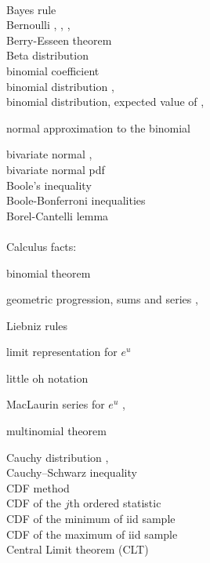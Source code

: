 \documentclass[12pt]{article}
\begin{document}
\\
\noindent Bayes rule \pageref{bayesrule1}\\
\noindent Bernoulli \pageref{e:bernoulli}, \pageref{d:bernoullip}, \pageref{e:bernoullipmean}, \pageref{bernoullipmoments}\\
\noindent Berry-Esseen theorem \pageref{berryesseen}\\
\noindent Beta distribution \pageref{betadistributionexample}\\
\noindent binomial coefficient \pageref{d:binomialcoeff}\\
\noindent binomial distribution \pageref{binomdist1}, \pageref{d:binomialnp}\\
\noindent binomial distribution, expected value of \pageref{e:binomialnpmean}, \pageref{expectedvalueofbinomial}

\quad normal approximation to the binomial \pageref{normalapproxtobinomial}

\noindent bivariate normal \pageref{bivariatenormaldist}, \pageref{bivariatenormal=2variate}\\
\noindent bivariate normal pdf \pageref{bivariatenormalpdf}\\
\noindent Boole's inequality \pageref{subadd1}\\
\noindent Boole-Bonferroni inequalities \pageref{boolebonferroni}\\
\noindent Borel-Cantelli lemma \pageref{borelcantelli}\\


\\
Calculus facts:

binomial theorem \pageref{d:binomialtheorem}

geometric progression, sums and series \pageref{d:geomseries1}, \pageref{d:geomseries}

Liebniz rules \pageref{liebnizrule}

limit representation for $e^u$ \pageref{d:limitrep}

little oh notation \pageref{d:littleoh}

MacLaurin series for $e^u$ \pageref{d:maclaurinseries1}, \pageref{d:maclaurinseries}

multinomial theorem \pageref{multinomialtheorem}

\noindent Cauchy distribution \pageref{Cauchypdf}, \pageref{Cauchypdf2}\\
\noindent Cauchy--Schwarz inequality \pageref{cauchyschwarz2}\\
\noindent CDF method \pageref{cdfmethod1}\\
\noindent CDF of the $j$th ordered statistic \pageref{cdfofjthorderedstatistic}\\
\noindent CDF of the minimum of iid sample \pageref{cdfofY1}\\
\noindent CDF of the maximum of iid sample \pageref{cdfofYn}\\
\noindent Central Limit theorem (CLT) \pageref{clt}
\end{document}
